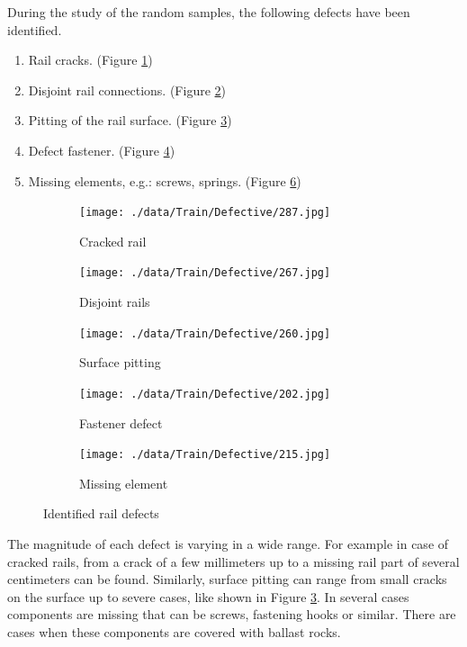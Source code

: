 \documentclass[10pt, final]{article}
\begin{document}
During the study of the random samples, the following defects have been identified.
\begin{enumerate}
	\item Rail cracks. (Figure \ref{fig:def_cracked})
	\item Disjoint rail connections. (Figure \ref{fig:def_disjoint})
	\item Pitting of the rail surface. (Figure \ref{fig:def_pitting})
	\item Defect fastener. (Figure \ref{fig:def_nofix})
	\item Missing elements, e.g.: screws, springs. (Figure \ref{fig:def_missing})
\end{enumerate}
\begin{figure}[!ht]
	\centering
	\begin{subfigure}{0.3\textwidth}
		\centering
		\texttt{[image: ./data/Train/Defective/287.jpg]}
		\caption{Cracked rail}
		\label{fig:def_cracked}
	\end{subfigure}
	\begin{subfigure}{0.3\textwidth}
		\centering
		\texttt{[image: ./data/Train/Defective/267.jpg]}
		\caption{Disjoint rails}
		\label{fig:def_disjoint}
	\end{subfigure}
	\begin{subfigure}{0.3\textwidth}
		\centering
		\texttt{[image: ./data/Train/Defective/260.jpg]}
		\caption{Surface pitting}
		\label{fig:def_pitting}
	\end{subfigure}
	\begin{subfigure}{0.3\textwidth}
		\centering
		\texttt{[image: ./data/Train/Defective/202.jpg]}
		\caption{Fastener defect}
		\label{fig:def_nofix}
	\end{subfigure}
	\begin{subfigure}{0.3\textwidth}
		\centering
		\texttt{[image: ./data/Train/Defective/215.jpg]}
		\caption{Missing element}
		\label{fig:def_missing}
	\end{subfigure}
	\caption{Identified rail defects}
\end{figure}

The magnitude of each defect is varying in a wide range.
For example in case of cracked rails, from a crack of a few millimeters up to a missing rail part of several
centimeters can be found.
Similarly, surface pitting can range from small cracks on the surface up to severe cases, like shown in
Figure \ref{fig:def_pitting}.
In several cases components are missing that can be screws, fastening hooks or similar.
There are cases when these components are covered with ballast rocks.
\end{document}
